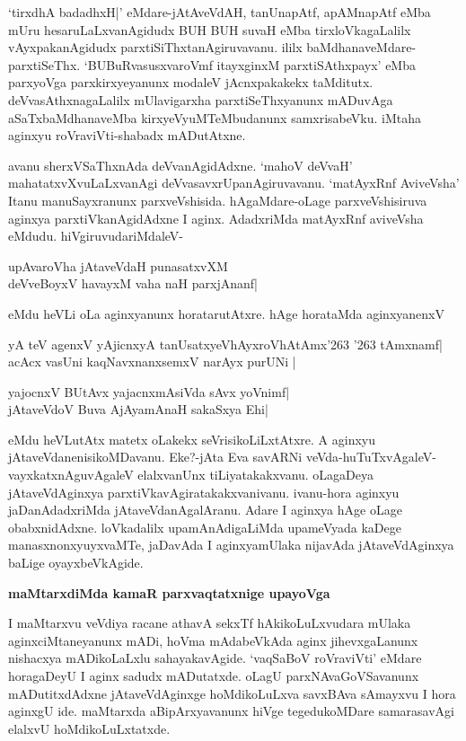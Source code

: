 `tirxdhA badadhxH|' eMdare-jAtAveVdAH, tanUnapAtf, apAMnapAtf eMba mUru 
hesaruLaLxvanAgidudx BUH BUH suvaH eMba tirxloVkagaLalilx vAyxpakanAgidudx parxtiSiThxtanAgiruvavanu. ililx baMdhanaveMdare-parxtiSeThx. `BUBuRvasusxvaroVmf itayxginxM parxtiSAthxpayx' eMba parxyoVga parxkirxyeyanunx modaleV jAcnxpakakekx taMditutx. deVvasAthxnagaLalilx mUlavigarxha parxtiSeThxyanunx mADuvAga aSaTxbaMdhanaveMba kirxyeVyuMTeMbudanunx samxrisabeVku. iMtaha aginxyu roVraviVti-shabadx mADutAtxne.

avanu sherxVSaThxnAda deVvanAgidAdxne. `mahoV deVvaH' 
mahatatxvXvuLaLxvanAgi deVvasavxrUpanAgiruvavanu. `matAyxRnf AviveVsha' Itanu manuSayxranunx parxveVshisida. hAgaMdare-oLage parxveVshisiruva aginxya parxtiVkanAgidAdxne  I aginx. AdadxriMda matAyxRnf aviveVsha eMdudu. hiVgiruvudariMdaleV-

\begin{shloka}
upAvaroVha jAtaveVdaH punasatxvXM\\
deVveBoyxV havayxM vaha naH parxjAnanf|
\end{shloka}

eMdu heVLi oLa aginxyanunx horatarutAtxre. hAge horataMda aginxyanenxV 

\begin{shloka}
yA teV agenxV yAjicnxyA tanUsatxyeVhAyxroVhAtAmx\char'263 \char'263 tAmxnamf|\\
acAcx vasUni kaqNavxnanxsemxV narAyx purUNi |
\end{shloka}

\begin{shloka}
yajocnxV BUtAvx yajacnxmAsiVda sAvx yoVnimf|\\
jAtaveVdoV Buva AjAyamAnaH sakaSxya Ehi|
\end{shloka}

eMdu heVLutAtx matetx oLakekx seVrisikoLiLxtAtxre. A aginxyu 
jAtaveVdanenisikoMDavanu. Eke?-jAta Eva savARNi 
veVda-huTuTxvAgaleV-vayxkatxnAguvAgaleV elalxvanUnx tiLiyatakakxvanu. oLagaDeya jAtaveVdAginxya parxtiVkavAgiratakakxvanivanu. ivanu-hora aginxyu jaDanAdadxriMda jAtaveVdanAgalAranu. Adare I aginxya hAge oLage obabxnidAdxne. loVkadalilx upamAnAdigaLiMda upameVyada kaDege manasxnonx\-yuyxvaMTe, jaDavAda I aginxyamUlaka nijavAda jAtaveVdAginxya baLige oyayxbeVkAgide.

\textbf{maMtarxdiMda kamaR parxvaqtatxnige upayoVga}

I maMtarxvu veVdiya racane athavA sekxTf hAkikoLuLxvudara mUlaka 
aginxciMtaneyanunx mADi, hoVma mAdabeVkAda aginx jihevxgaLanunx nishacxya mADikoLaLxlu sahayakavAgide. `vaqSaBoV roVraviVti' eMdare horagaDeyU I aginx sadudx mADutatxde. oLagU parxNAvaGoVSavanunx mADutitxdAdxne jAtaveVdAginxge hoMdikoLuLxva savxBAva sAmayxvu I hora aginxgU ide. maMtarxda aBipArxyavanunx hiVge tegedukoMDare samarasavAgi elalxvU hoMdikoLuLxtatxde.

